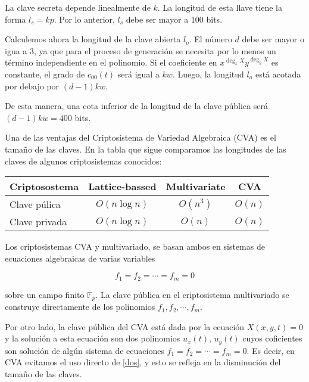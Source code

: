 \documentclass[12pt]{article}
\begin{document}
La clave secreta depende linealmente de $k$. La longitud de esta llave tiene la forma  $l_s = kp$. Por lo anterior, $l_s$  debe ser mayor a 100 bits.


Calculemos ahora la longitud de la clave abierta $l_o$. El número $d$  debe ser mayor o igua a 3, ya que para el proceso de generación se necesita por lo menos un t\'ermino independiente en el polinomio. Si el coeficiente en $x^{\deg_x X}y^{\deg_y X}$  es constante, el grado de $c_{00}(t)$ ser\'a igual a $kw$. Luego, la longitud $l_o$ est\'a acotada por debajo por $(d-1)kw$. 


De esta manera, una cota inferior de la longitud de la clave p\'ublica ser\'a
 $(d-1)kw = 400$ bits. 
 
Una de las ventajas del Criptosistema de Variedad Algebraica (CVA) es el tama\~no de las claves. En la tabla que sigue comparamos las longitudes de las claves de algunos criptosistemas conocidos:



\begin{center}
\begin{tabular}{|l|c|c|c|}

\hline\hline
Criptosostema & Lattice-bassed  &  Multivariate &  CVA\\
\hline
Clave p\'ulica & $O(n\log  n)$ & $O(n^3)$ & $O(n)$\\
\hline
Clave privada & $O(n\log  n)$ & $O(n)$ & $O(n)$\\ 
\hline\hline
\end{tabular}
\end{center}

Los criptosistemas CVA y multivariado, se basan ambos en sistemas de ecuaciones algebraicas de varias variables

\begin{equation}\label{dos}
f_1 = f_2 = \cdots = f_m =0
\end{equation}

sobre un campo finito $\mathbb{F}_p$. La clave p\'ublica en el criptosistema multivariado se construye directamente de los polinomios $f_1, f_2, \cdots, f_m$. 

 Por otro lado, la clave p\'ublica del CVA est\'a dada por la ecuaci\'on $X(x,y,t)=0$
 y la  soluci\'on a esta ecuaci\'on son dos polinomios  $u_x(t)$, $u_y(t)$ cuyos coficientes son soluci\'on de alg\'un sistema de ecuaciones $f_1 = f_2 = \cdots = f_m =0$. Es decir, en CVA evitamos el uso directo de \ref{dos}, y esto se refleja en la disminuci\'on del tama\~no de las claves.
\end{document}
